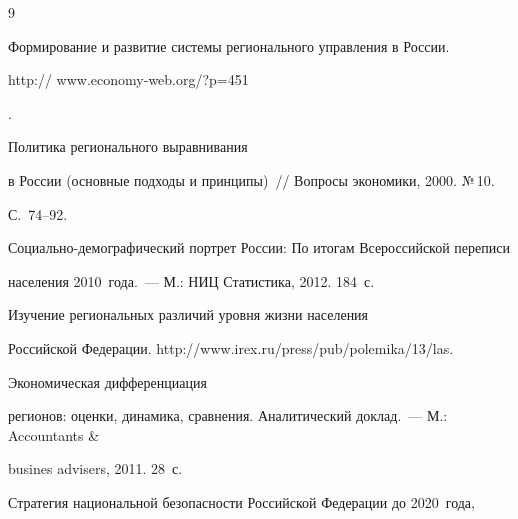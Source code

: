 {\small\frenchspacing


{%




\begin{thebibliography}{9}





\vspace*{-2pt}







     Формирование и развитие системы регионального управления в России. {\sf


http:// www.economy-web.org/?p=451}.







 Политика регионального выравнивания


в России (основные подходы и принципы)~/\!\!/ Вопросы экономики, 2000. №\,10.


С.~74--92.







     Социально-демографический портрет России: По итогам Всероссийской переписи


населения 2010~года.~--- М.: НИЦ Статистика, 2012. 184~с.







      Изучение региональных различий уровня жизни населения


Российской Федерации. {\sf http://www.irex.ru/press/pub/polemika/13/las}.




      Экономическая дифференциация


регионов: оценки, динамика, сравнения. Аналитический доклад.~--- М.: Accountants \&


busines advisers, 2011. 28~с.







     Стратегия национальной безопасности Российской Федерации до 2020~года,



\end{thebibliography}}}
